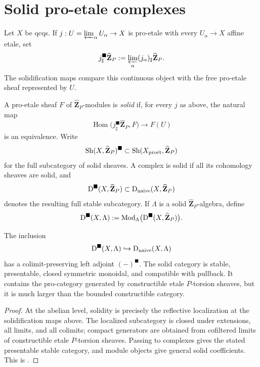 \section{Solid pro-etale complexes}

Let \(X\) be qcqs.  If
\(j:U=\varprojlim_\alpha U_\alpha\to X\) is pro-etale with every
\(U_\alpha\to X\) affine etale, set
\[
 j^{\blacksquare}_{\sharp}\widehat{\mathbf Z}_{P}
   :=\varprojlim_\alpha
      (j_\alpha)_\sharp\widehat{\mathbf Z}_{P}.
\]
The solidification maps compare this continuous object with the free
pro-etale sheaf represented by \(U\).

\begin{definition}
\label{def:solid-ambient-category}
A pro-etale sheaf \(F\) of \(\widehat{\mathbf Z}_{P}\)-modules is
\emph{solid} if, for every \(j\) as above, the natural map
\[
 \operatorname{Hom}
  \bigl(j^{\blacksquare}_{\sharp}\widehat{\mathbf Z}_{P},F\bigr)
   \longrightarrow F(U)
\]
is an equivalence.  Write
\[
 \operatorname{Sh}(X,\widehat{\mathbf Z}_{P})^{\blacksquare}
  \subset
 \operatorname{Sh}(X_{\mathrm{pro\acute et}},\widehat{\mathbf Z}_{P})
\]
for the full subcategory of solid sheaves.  A complex is solid if all its
cohomology sheaves are solid, and
\[
 \mathrm D^{\blacksquare}(X,\widehat{\mathbf Z}_{P})
  \subset
 \mathrm D_{\mathrm{naive}}(X,\widehat{\mathbf Z}_{P})
\]
denotes the resulting full stable subcategory.  If \(\Lambda\) is a solid
\(\widehat{\mathbf Z}_{P}\)-algebra, define
\[
 \mathrm D^{\blacksquare}(X,\Lambda)
   :=\operatorname{Mod}_{\Lambda}
      \bigl(\mathrm D^{\blacksquare}(X,\widehat{\mathbf Z}_{P})\bigr).
\]
\end{definition}

\begin{theorem}[Solidification]
\label{thm:solidification-properties}
The inclusion
\[
 \mathrm D^{\blacksquare}(X,\Lambda)\hookrightarrow\mathrm D_{\mathrm{naive}}(X,\Lambda)
\]
has a colimit-preserving left adjoint \((-)^{\blacksquare}\).  The solid
category is stable, presentable, closed symmetric monoidal, and compatible
with pullback.  It contains the pro-category generated by constructible
etale \(P\)-torsion sheaves, but it is much larger than the bounded
constructible category.
\end{theorem}

\begin{proof}
At the abelian level, solidity is precisely the reflective localization at
the solidification maps above.  The localized subcategory is closed under
extensions, all limits, and all colimits; compact generators are obtained
from cofiltered limits of constructible etale \(P\)-torsion sheaves.  Passing
to complexes gives the stated presentable stable category, and module objects
give general solid coefficients.  This is
\cite[Theorem~1.2.8 and Corollary~1.3.2]
{RuimyTubachWolfSolid}.
\end{proof}


